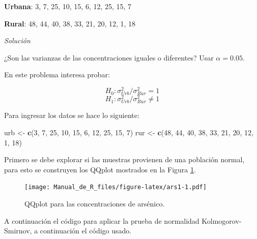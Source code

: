 \documentclass[10pt,]{krantz}
\makeatletter
\newenvironment{Shaded}{\begin{snugshade}}{\end{snugshade}}
\newcommand{\KeywordTok}[1]{\textcolor[rgb]{0.13,0.29,0.53}{\textbf{#1}}}
\newcommand{\DecValTok}[1]{\textcolor[rgb]{0.00,0.00,0.81}{#1}}
\newcommand{\StringTok}[1]{\textcolor[rgb]{0.31,0.60,0.02}{#1}}
\newcommand{\CommentTok}[1]{\textcolor[rgb]{0.56,0.35,0.01}{\textit{#1}}}
\newcommand{\OperatorTok}[1]{\textcolor[rgb]{0.81,0.36,0.00}{\textbf{#1}}}
\newcommand{\NormalTok}[1]{#1}
\newenvironment{kframe}{%
\medskip{}
\setlength{\fboxsep}{.8em}
 \def\at@end@of@kframe{}%
 \ifinner\ifhmode%
  \def\at@end@of@kframe{\end{minipage}}%
  \begin{minipage}{\columnwidth}%
 \fi\fi%
 \def\FrameCommand##1{\hskip\@totalleftmargin \hskip-\fboxsep
 \colorbox{shadecolor}{##1}\hskip-\fboxsep
     \hskip-\linewidth \hskip-\@totalleftmargin \hskip\columnwidth}%
 \MakeFramed {\advance\hsize-\width
   \@totalleftmargin\z@ \linewidth\hsize
   \@setminipage}}%
 {\par\unskip\endMakeFramed%
 \at@end@of@kframe}
\renewenvironment{Shaded}{\begin{kframe}}{\end{kframe}}
\makeatother
\begin{document}
\textbf{Urbana}: 3, 7, 25, 10, 15, 6, 12, 25, 15, 7

\textbf{Rural}: 48, 44, 40, 38, 33, 21, 20, 12, 1, 18

\emph{Solución}

¿Son las varianzas de las concentraciones iguales o diferentes? Usar
\(\alpha=0.05\).

En este problema interesa probar:

\[H_0: \sigma_{Urb}^2 / \sigma_{Rur}^2 = 1\]
\[H_1: \sigma_{Urb}^2 / \sigma_{Rur}^2 \neq 1\]

Para ingresar los datos se hace lo siguiente:

\begin{Shaded}
\begin{Highlighting}[]
\NormalTok{urb <-}\StringTok{ }\KeywordTok{c}\NormalTok{(}\DecValTok{3}\NormalTok{, }\DecValTok{7}\NormalTok{, }\DecValTok{25}\NormalTok{, }\DecValTok{10}\NormalTok{, }\DecValTok{15}\NormalTok{, }\DecValTok{6}\NormalTok{, }\DecValTok{12}\NormalTok{, }\DecValTok{25}\NormalTok{, }\DecValTok{15}\NormalTok{, }\DecValTok{7}\NormalTok{)}
\NormalTok{rur <-}\StringTok{ }\KeywordTok{c}\NormalTok{(}\DecValTok{48}\NormalTok{, }\DecValTok{44}\NormalTok{, }\DecValTok{40}\NormalTok{, }\DecValTok{38}\NormalTok{, }\DecValTok{33}\NormalTok{, }\DecValTok{21}\NormalTok{, }\DecValTok{20}\NormalTok{, }\DecValTok{12}\NormalTok{, }\DecValTok{1}\NormalTok{, }\DecValTok{18}\NormalTok{)}
\end{Highlighting}
\end{Shaded}

Primero se debe explorar si las muestras provienen de una población
normal, para esto se construyen los QQplot mostrados en la Figura
\ref{fig:ars1}.

\begin{figure}
\centering
\texttt{[image: Manual\_de\_R\_files/figure-latex/ars1-1.pdf]}
\caption{\label{fig:ars1}QQplot para las concentraciones de arsénico.}
\end{figure}

A continuación el código para aplicar la prueba de normalidad
Kolmogorov-Smirnov, a continuación el código usado.

\begin{Shaded}
\end{Shaded}
\end{document}
